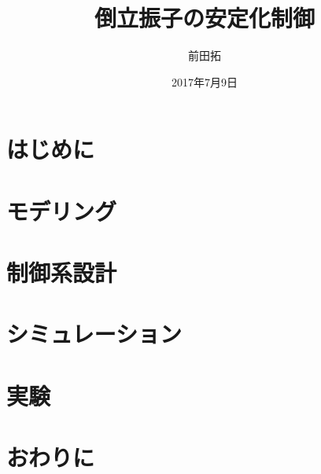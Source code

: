 \documentclass[a4j, 11pt, twoside]{jbook}
\begin{document}
\title{倒立振子の安定化制御}
\author{前田拓}
\date{2017年7月9日}
\maketitle

\tableofcontents
\listoffigures
\listoftables
{}

\chapter{はじめに}

\chapter{モデリング}

\chapter{制御系設計}

\chapter{シミュレーション}

\chapter{実験}

\chapter{おわりに}
\end{document}
